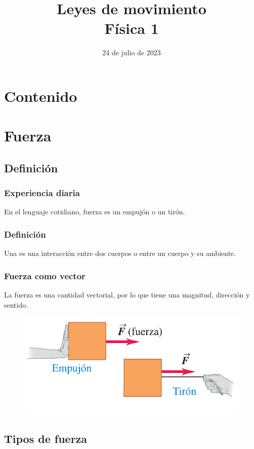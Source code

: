\documentclass[14pt]{beamer}
\title{\Large{Leyes de movimiento} \\ \normalsize{Física 1}}
\date{24 de julio de 2023}
\begin{document}
\maketitle

\section*{Contenido}


\section{Fuerza}
\subsection{Definición}

\begin{frame}
\frametitle{Experiencia diaria}
En el lenguaje cotidiano, fuerza es un empujón o un tirón.
\end{frame}
\begin{frame}
\frametitle{Definición}
Una  es una interacción entre dos cuerpos o entre un cuerpo y su ambiente.
\end{frame}
\begin{frame}
\frametitle{Fuerza como vector}
La fuerza es una cantidad vectorial, por lo que tiene una magnitud, dirección y sentido.
\begin{figure}
    \centering
    \includegraphics[scale=0.8]{Imagenes/Fuerza_01.png}
\end{figure}
\end{frame}

\subsection{Tipos de fuerza}
\end{document}
